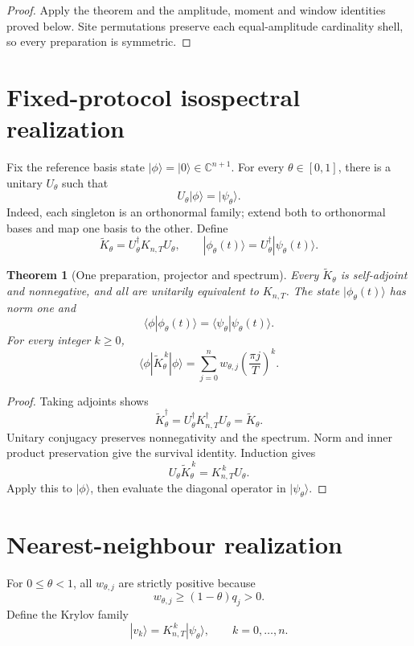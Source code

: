 \documentclass[12pt]{article}
\newtheorem{theorem}{Theorem}[section]
\newcommand{\C}{\mathbb C}
\begin{document}
\begin{proof}
Apply the theorem and the amplitude, moment and window identities proved
below. Site permutations preserve each equal-amplitude cardinality shell,
so every preparation is symmetric.
\end{proof}

\section{Fixed-protocol isospectral realization}

Fix the reference basis state \(|\phi\rangle=|0\rangle\in\C^{n+1}\). For every
\(\theta\in[0,1]\), there is a unitary \(U_\theta\) such that
\[
 U_\theta|\phi\rangle=|\psi_\theta\rangle.
\]
Indeed, each singleton is an orthonormal family; extend both to orthonormal
bases and map one basis to the other. Define
\[
 \widetilde K_{\theta}=U_\theta^\dagger K_{n,T}U_\theta,\qquad
 |\phi_\theta(t)\rangle=U_\theta^\dagger|\psi_\theta(t)\rangle.
\]

\begin{theorem}[One preparation, projector and spectrum]
Every \(\widetilde K_\theta\) is self-adjoint and nonnegative, and all are
unitarily equivalent to \(K_{n,T}\). The state
\(|\phi_\theta(t)\rangle\) has norm one and
\[
 \langle\phi|\phi_\theta(t)\rangle
 =\langle\psi_\theta|\psi_\theta(t)\rangle.
\]
For every integer \(k\geq0\),
\[
 \langle\phi|\widetilde K_\theta^{\,k}|\phi\rangle
 =\sum_{j=0}^{n}w_{\theta,j}\left(\frac{\pi j}{T}\right)^k.
\]
\end{theorem}

\begin{proof}
Taking adjoints shows
\[
 \widetilde K_\theta^\dagger
 =U_\theta^\dagger K_{n,T}^\dagger U_\theta
 =\widetilde K_\theta.
\]
Unitary conjugacy preserves nonnegativity and the spectrum. Norm and inner
product preservation give the survival identity. Induction gives
\[
 U_\theta\widetilde K_\theta^{\,k}
 =K_{n,T}^{\,k}U_\theta.
\]
Apply this to \(|\phi\rangle\), then evaluate the diagonal operator in
\(|\psi_\theta\rangle\).
\end{proof}

\section{Nearest-neighbour realization}

For \(0\leq\theta<1\), all \(w_{\theta,j}\) are strictly positive because
\[
w_{\theta,j}\geq(1-\theta)q_j>0.
\]
Define the Krylov family
\[
 |v_k\rangle=K_{n,T}^{\,k}|\psi_\theta\rangle,
 \qquad k=0,\ldots,n.
\]
\end{document}
